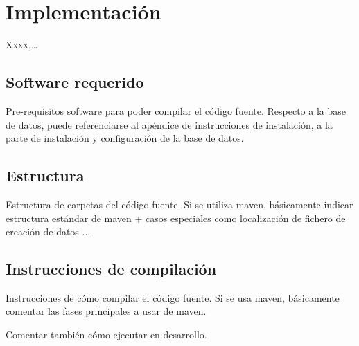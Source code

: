 \chapter{Implementación}
\label{chap:implementacion}

\lettrine{X}{xxx},\dots

\section{Software requerido}

{ \color{red} Pre-requisitos software para poder compilar el código fuente. Respecto a la base de datos, puede referenciarse al apéndice de instrucciones de instalación, a la parte de instalación y configuración de la base de datos. } 

\section{Estructura}

{ \color{red} Estructura de carpetas del código fuente. Si se utiliza maven, básicamente indicar estructura estándar de maven + casos especiales como localización de fichero de creación de datos ...}

\section{Instrucciones de compilación}

{ \color{red} Instrucciones de cómo compilar el código fuente. Si se usa maven, básicamente comentar las fases principales a usar de maven. 

  Comentar también cómo ejecutar en desarrollo.}